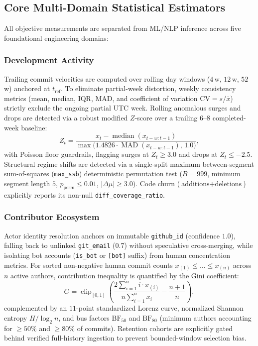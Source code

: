 \documentclass[conference]{IEEEtran}
\begin{document}
\subsection{Core Multi-Domain Statistical Estimators}
All objective measurements are separated from ML/NLP inference across five foundational engineering domains:

\subsubsection{Development Activity}
Trailing commit velocities are computed over rolling day windows ($4$\,w, $12$\,w, $52$\,w) anchored at $t_{\text{ref}}$. To eliminate partial-week distortion, weekly consistency metrics (mean, median, IQR, MAD, and coefficient of variation $\text{CV} = s / \bar{x}$) strictly exclude the ongoing partial UTC week. Rolling anomalous surges and drops are detected via a robust modified $Z$-score over a trailing $6$--$8$ completed-week baseline:
\begin{equation}
    Z_t = \frac{x_t - \operatorname{median}(x_{t-w:t-1})}{\max\!\bigl(1.4826 \cdot \operatorname{MAD}(x_{t-w:t-1}),\, 1.0\bigr)},
\end{equation}
with Poisson floor guardrails, flagging surges at $Z_t \ge 3.0$ and drops at $Z_t \le -2.5$. Structural regime shifts are detected via a single-split maximum between-segment sum-of-squares (\texttt{max\_ssb}) deterministic permutation test ($B=999$, minimum segment length $5$, $p_{\text{perm}} \le 0.01$, $|\Delta\mu| \ge 3.0$). Code churn ($\text{additions}+\text{deletions}$) explicitly reports its non-null \texttt{diff\_coverage\_ratio}.

\subsubsection{Contributor Ecosystem}
Actor identity resolution anchors on immutable \texttt{github\_id} (confidence $1.0$), falling back to unlinked \texttt{git\_email} ($0.7$) without speculative cross-merging, while isolating bot accounts (\texttt{is\_bot} or \texttt{[bot]} suffix) from human concentration metrics. For sorted non-negative human commit counts $x_{(1)} \le \dots \le x_{(n)}$ across $n$ active authors, contribution inequality is quantified by the Gini coefficient:
\begin{equation}
    G = \operatorname{clip}_{[0,1]}\!\left(\frac{2 \sum_{i=1}^{n} i \cdot x_{(i)}}{n \sum_{i=1}^{n} x_i} - \frac{n+1}{n}\right),
\end{equation}
complemented by an $11$-point standardized Lorenz curve, normalized Shannon entropy $H / \log_2 n$, and bus factors $\text{BF}_{50}$ and $\text{BF}_{80}$ (minimum authors accounting for $\ge 50\%$ and $\ge 80\%$ of commits). Retention cohorts are explicitly gated behind verified full-history ingestion to prevent bounded-window selection bias.
\end{document}
